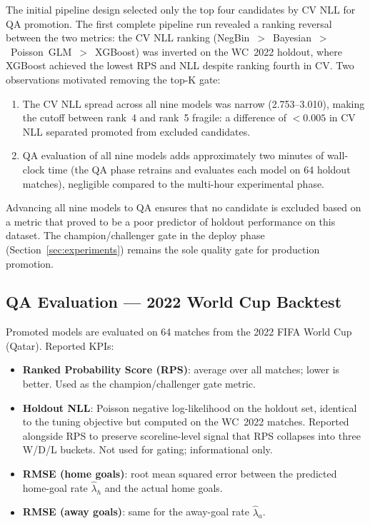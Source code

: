 \documentclass[conference]{IEEEtran}
\begin{document}
The initial pipeline design selected only the top four candidates by CV NLL for QA
promotion. The first complete pipeline run revealed a ranking reversal between the
two metrics: the CV NLL ranking (NegBin~$>$~Bayesian~$>$~Poisson~GLM~$>$~XGBoost)
was inverted on the WC~2022 holdout, where XGBoost achieved the lowest RPS and NLL 
despite ranking fourth in CV.  Two observations motivated removing the top-K gate:
\begin{enumerate}
  \item The CV NLL spread across all nine models was narrow
  (2.753--3.010), making the cutoff between rank~4 and rank~5 fragile: a
  difference of $<0.005$ in CV NLL separated promoted from excluded candidates.
  \item QA evaluation of all nine models adds approximately two minutes of
  wall-clock time (the QA phase retrains and evaluates each model on 64
  holdout matches), negligible compared to the multi-hour
  experimental phase.
\end{enumerate}
Advancing all nine models to QA ensures that no candidate is excluded based
on a metric that proved to be a poor predictor of holdout performance on this
dataset.  The champion/challenger gate in the deploy phase
(Section~\ref{sec:experiments}) remains the sole quality gate for production
promotion.

\subsection{QA Evaluation — 2022 World Cup Backtest}

Promoted models are evaluated on 64 matches from the 2022 FIFA World Cup (Qatar).
Reported KPIs:
\begin{itemize}
  \item \textbf{Ranked Probability Score (RPS)}: average over all matches; lower is better.
  Used as the champion/challenger gate metric.
  \item \textbf{Holdout NLL}: Poisson negative log-likelihood on the holdout set, identical
  to the tuning objective but computed on the WC~2022 matches. Reported alongside RPS to
  preserve scoreline-level signal that RPS collapses into three W/D/L buckets. Not used
  for gating; informational only.
  \item \textbf{RMSE (home goals)}: root mean squared error between the
  predicted home-goal rate $\hat{\lambda}_h$ and the actual home goals.
  \item \textbf{RMSE (away goals)}: same for the away-goal rate
  $\hat{\lambda}_a$.
\end{itemize}
\end{document}
